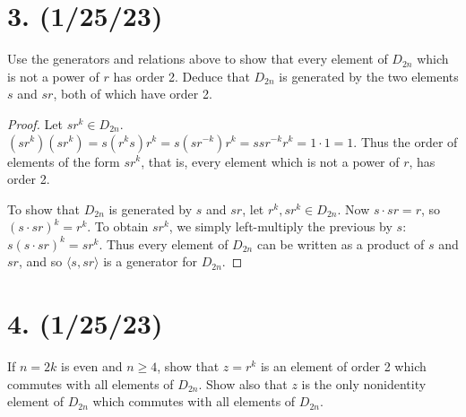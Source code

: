 \documentclass{article}
\begin{document}
\section*{3. (1/25/23)}

Use the generators and relations above to show that every element of $D_{2n}$ which is not a power of $r$ has order 2. Deduce that $D_{2n}$ is generated by the two elements $s$ and $sr$, both of which have order 2.

\begin{proof}
    Let $sr^k \in D_{2n}$. $(sr^k)(sr^k) = s(r^k s) r^k = s (s r^{-k}) r^{k} = ss r^{-k} r^k = 1 \cdot 1 = 1$. Thus the order of elements of the form $sr^k$, that is, every element which is not a power of $r$, has order 2.

    To show that $D_{2n}$ is generated by $s$ and $sr$, let $r^k, sr^k \in D_{2n}$. Now $s \cdot sr = r$, so $(s \cdot sr)^k = r^k$. To obtain $sr^k$, we simply left-multiply the previous by $s$: $s(s \cdot sr)^k = sr^k$. Thus every element of $D_{2n}$ can be written as a product of $s$ and $sr$, and so $\langle s, sr \rangle$ is a generator for $D_{2n}$.
\end{proof}

\section*{4. (1/25/23)}

If $n = 2k$ is even and $n \geq 4$, show that $z = r^k$ is an element of order 2 which commutes with all elements of $D_{2n}$. Show also that $z$ is the only nonidentity element of $D_{2n}$ which commutes with all elements of $D_{2n}$.
\end{document}
